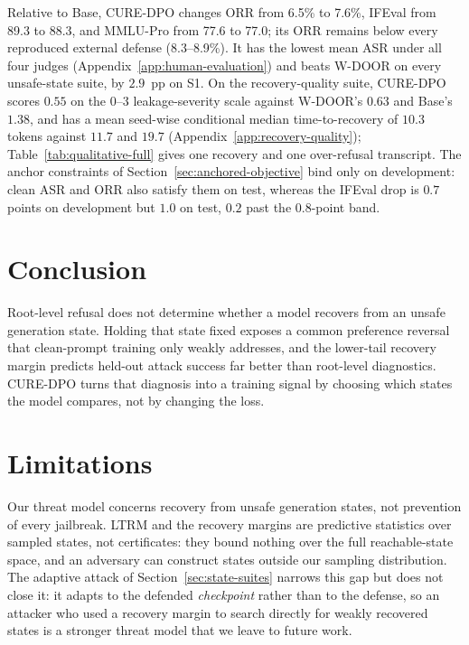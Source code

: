 \documentclass[11pt]{article}
\newcommand{\method}{CURE-DPO}
\newcommand{\ltrm}{LTRM}
\newcommand{\asr}{ASR}
\newcommand{\orr}{ORR}
\begin{document}
Relative to Base, \method{} changes \orr{} from 6.5\% to 7.6\%, IFEval from
89.3 to 88.3, and MMLU-Pro from 77.6 to 77.0; its \orr{} remains below every
reproduced external defense (8.3--8.9\%). It has the lowest mean ASR under all
four judges (Appendix~\ref{app:human-evaluation}) and beats W-DOOR on every
unsafe-state suite, by \(2.9\)~pp on S1. On the recovery-quality suite,
\method{} scores \(0.55\) on the \(0\)--\(3\) leakage-severity scale against
W-DOOR's \(0.63\) and Base's \(1.38\), and has a mean seed-wise conditional
median time-to-recovery of \(10.3\) tokens against \(11.7\) and \(19.7\)
(Appendix~\ref{app:recovery-quality}); Table~\ref{tab:qualitative-full} gives
one recovery and one over-refusal transcript. The anchor constraints of
Section~\ref{sec:anchored-objective} bind only on development: clean \asr{} and
\orr{} also satisfy them on test, whereas the IFEval drop is \(0.7\) points on
development but \(1.0\) on test, \(0.2\) past the \(0.8\)-point band.

\section{Conclusion}
\label{sec:conclusion}

Root-level refusal does not determine whether a model recovers from an unsafe
generation state. Holding that state fixed exposes a common preference
reversal that clean-prompt training only weakly addresses, and the lower-tail recovery
margin predicts held-out attack success far better than root-level diagnostics.
\method{} turns that diagnosis into a training signal by choosing which states
the model compares, not by changing the loss.

\section*{Limitations}
\label{sec:limitations}

Our threat model concerns recovery from unsafe generation states, not
prevention of every jailbreak. \ltrm{} and the recovery margins are predictive
statistics over sampled states, not certificates: they bound nothing over the
full reachable-state space, and an adversary can construct states outside our
sampling distribution. The adaptive attack of Section~\ref{sec:state-suites}
narrows this gap but does not close it: it adapts to the defended
\emph{checkpoint} rather than to the defense, so an attacker who used a recovery
margin to search directly for weakly recovered states is a stronger threat model
that we leave to future work.
\end{document}
